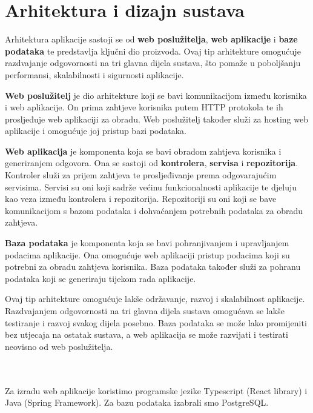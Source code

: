 \chapter{Arhitektura i dizajn sustava}
        Arhitektura aplikacije sastoji se od \textbf{web poslužitelja}, \textbf{web aplikacije} i \textbf{baze podataka} te predstavlja ključni dio proizvoda. Ovaj tip arhitekture omogućuje razdvajanje odgovornosti na tri glavna dijela sustava, što pomaže u poboljšanju performansi, skalabilnosti i sigurnosti aplikacije.

       \textbf{Web poslužitelj} je dio arhitekture koji se bavi komunikacijom između korisnika i web aplikacije. On prima zahtjeve korisnika putem HTTP protokola te ih prosljeđuje web aplikaciji za obradu. Web poslužitelj također služi za hosting web aplikacije i omogućuje joj pristup bazi podataka.
        
        \textbf{Web aplikacija} je komponenta koja se bavi obradom zahtjeva korisnika i generiranjem odgovora. Ona se sastoji od \textbf{kontrolera}, \textbf{servisa} i \textbf{repozitorija}. Kontroler služi za prijem zahtjeva te prosljeđivanje prema odgovarajućim servisima. Servisi su oni koji sadrže većinu funkcionalnosti aplikacije te djeluju kao veza između kontrolera i repozitorija. Repozitoriji su oni koji se bave komunikacijom s bazom podataka i dohvaćanjem potrebnih podataka za obradu zahtjeva.
        
        \textbf{Baza podataka} je komponenta koja se bavi pohranjivanjem i upravljanjem podacima aplikacije. Ona omogućuje web aplikaciji pristup podacima koji su potrebni za obradu zahtjeva korisnika. Baza podataka također služi za pohranu podataka koji se generiraju tijekom rada aplikacije.
        
        Ovaj tip arhitekture omogućuje lakše održavanje, razvoj i skalabilnost aplikacije. Razdvajanjem odgovornosti na tri glavna dijela sustava omogućava se lakše testiranje i razvoj svakog dijela posebno. Baza podataka se može lako promijeniti bez utjecaja na ostatak sustava, a web aplikacija se može razvijati i testirati neovisno od web poslužitelja.
        
        \\
        \\
        Za izradu web aplikacije koristimo programske jezike Typescript (React library) i Java (Spring Framework). Za bazu podataka izabrali smo PostgreSQL.
        \\
        \\
        
